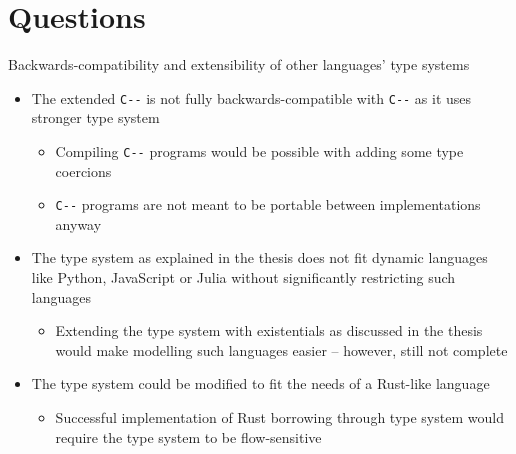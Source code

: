 \documentclass[aspectratio=169]{beamer}
\def\cmm{\texttt{C-\relax-}}
\begin{document}
\section{Questions}

\begin{frame}{Backwards-compatibility and extensibility of other languages' type systems}
  \begin{itemize}
    \item The extended \cmm{} is not fully backwards-compatible with \cmm{} as it uses stronger type system
    \begin{itemize}
      \item Compiling \cmm{} programs would be possible with adding some type coercions
      \item \cmm{} programs are not meant to be portable between implementations anyway
    \end{itemize}
    \item The type system as explained in the thesis does not fit dynamic languages like Python, JavaScript or Julia without significantly restricting such languages
    \begin{itemize}
      \item Extending the type system with existentials as discussed in the thesis would make modelling such languages easier -- however, still not complete
    \end{itemize}
    \item The type system could be modified to fit the needs of a Rust-like language
    \begin{itemize}
      \item Successful implementation of Rust borrowing through type system would require the type system to be flow-sensitive
    \end{itemize}
  \end{itemize}
\end{frame}
\end{document}
